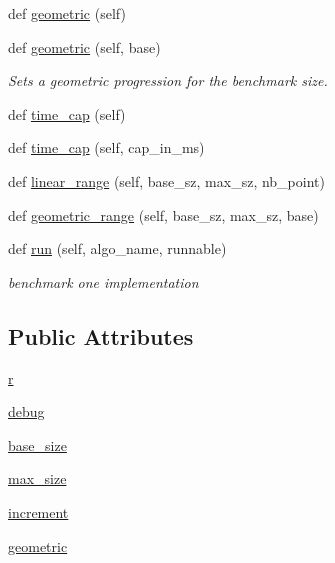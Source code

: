 \begin{DoxyCompactItemize}
def \mbox{\hyperlink{classbridges_1_1sorting__benchmark_1_1_sorting_benchmark_a0ccdd8c0ab411934335c41814325e2c1}{geometric}} (self)
\item 
def \mbox{\hyperlink{classbridges_1_1sorting__benchmark_1_1_sorting_benchmark_a003c4fe5333585f2130609ea24e3eb72}{geometric}} (self, base)
\begin{DoxyCompactList}\small\item\em Sets a geometric progression for the benchmark size. \end{DoxyCompactList}\item 
def \mbox{\hyperlink{classbridges_1_1sorting__benchmark_1_1_sorting_benchmark_a125d5bf68c5eb0fa1b319e37582fdc42}{time\+\_\+cap}} (self)
\item 
def \mbox{\hyperlink{classbridges_1_1sorting__benchmark_1_1_sorting_benchmark_af0705baca355e23e9e92f8d85a5fd33f}{time\+\_\+cap}} (self, cap\+\_\+in\+\_\+ms)
\item 
def \mbox{\hyperlink{classbridges_1_1sorting__benchmark_1_1_sorting_benchmark_ab5bfca8680018f4c043a78b25dbc1948}{linear\+\_\+range}} (self, base\+\_\+sz, max\+\_\+sz, nb\+\_\+point)
\item 
def \mbox{\hyperlink{classbridges_1_1sorting__benchmark_1_1_sorting_benchmark_ac9bc45a12b3ebab79d05785c01e4a99e}{geometric\+\_\+range}} (self, base\+\_\+sz, max\+\_\+sz, base)
\item 
def \mbox{\hyperlink{classbridges_1_1sorting__benchmark_1_1_sorting_benchmark_a419601bff1043add1068cc957c924f49}{run}} (self, algo\+\_\+name, runnable)
\begin{DoxyCompactList}\small\item\em benchmark one implementation \end{DoxyCompactList}\end{DoxyCompactItemize}
\subsection*{Public Attributes}
\begin{DoxyCompactItemize}
\item 
\mbox{\hyperlink{classbridges_1_1sorting__benchmark_1_1_sorting_benchmark_ae7fb15c11ff3cd6f17a2966f70d26a92}{r}}
\item 
\mbox{\hyperlink{classbridges_1_1sorting__benchmark_1_1_sorting_benchmark_abe5f172441e50097fecbd69fb724fd62}{debug}}
\item 
\mbox{\hyperlink{classbridges_1_1sorting__benchmark_1_1_sorting_benchmark_a5cf6780eab930f6dc96a517839c14bf7}{base\+\_\+size}}
\item 
\mbox{\hyperlink{classbridges_1_1sorting__benchmark_1_1_sorting_benchmark_af1aa3db22656da5aad6992547146e1c7}{max\+\_\+size}}
\item 
\mbox{\hyperlink{classbridges_1_1sorting__benchmark_1_1_sorting_benchmark_aa3b593efe1eac874fcb18a326b1b51d1}{increment}}
\item 
\mbox{\hyperlink{classbridges_1_1sorting__benchmark_1_1_sorting_benchmark_a3f5b4fe45cba8268f53716f6eb322a66}{geometric}}
\end{DoxyCompactItemize}


